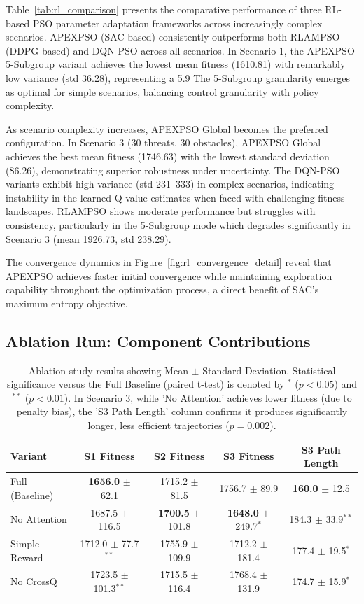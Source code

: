 \documentclass[fleqn,10pt]{wlscirep}
\begin{document}
Table~\ref{tab:rl_comparison} presents the comparative performance of three RL-based PSO parameter adaptation frameworks across increasingly complex scenarios.
APEXPSO (SAC-based) consistently outperforms both RLAMPSO (DDPG-based) and DQN-PSO across all scenarios.
In Scenario 1, the APEXPSO 5-Subgroup variant achieves the lowest mean fitness (1610.81) with remarkably low variance (std 36.28), representing a 5.9%
The 5-Subgroup granularity emerges as optimal for simple scenarios, balancing control granularity with policy complexity.

As scenario complexity increases, APEXPSO Global becomes the preferred configuration.
In Scenario 3 (30 threats, 30 obstacles), APEXPSO Global achieves the best mean fitness (1746.63) with the lowest standard deviation (86.26), demonstrating superior robustness under uncertainty.
The DQN-PSO variants exhibit high variance (std 231--333) in complex scenarios, indicating instability in the learned Q-value estimates when faced with challenging fitness landscapes.
RLAMPSO shows moderate performance but struggles with consistency, particularly in the 5-Subgroup mode which degrades significantly in Scenario 3 (mean 1926.73, std 238.29).

The convergence dynamics in Figure~\ref{fig:rl_convergence_detail} reveal that APEXPSO achieves faster initial convergence while maintaining exploration capability throughout the optimization process, a direct benefit of SAC's maximum entropy objective.

\subsection*{Ablation Run: Component Contributions}

\begin{table}[H]
\centering
\small
\begin{tabular}{lcccc}
\hline
\textbf{Variant} & \textbf{S1 Fitness} & \textbf{S2 Fitness} & \textbf{S3 Fitness} & \textbf{S3 Path Length} \\
\hline
Full (Baseline) & \textbf{1656.0} $\pm$ 62.1 & 1715.2 $\pm$ 81.5 & 1756.7 $\pm$ 89.9 & \textbf{160.0} $\pm$ 12.5 \\
\hline
No Attention & 1687.5 $\pm$ 116.5 & \textbf{1700.5} $\pm$ 101.8 & \textbf{1648.0} $\pm$ 249.7$^{*}$ & 184.3 $\pm$ 33.9$^{**}$ \\
\hline
Simple Reward & 1712.0 $\pm$ 77.7$^{**}$ & 1755.9 $\pm$ 109.9 & 1712.2 $\pm$ 181.4 & 177.4 $\pm$ 19.5$^{*}$ \\
\hline
No CrossQ & 1723.5 $\pm$ 101.3$^{**}$ & 1715.5 $\pm$ 116.4 & 1768.4 $\pm$ 131.9 & 174.7 $\pm$ 15.9$^{*}$ \\
\hline
\end{tabular}
\caption{Ablation study results showing Mean $\pm$ Standard Deviation. Statistical significance versus the Full Baseline (paired t-test) is denoted by $^{*}$ ($p < 0.05$) and $^{**}$ ($p < 0.01$). In Scenario 3, while 'No Attention' achieves lower fitness (due to penalty bias), the 'S3 Path Length' column confirms it produces significantly longer, less efficient trajectories ($p=0.002$).}
\label{tab:ablation_run}
\end{table}
\end{document}
